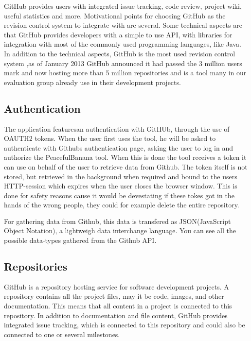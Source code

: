 GitHub provides users with integrated issue tracking, code review, project wiki, useful statistics and more. 
Motivational points for choosing GitHub as the revision control system to integrate with are several. Some technical aspects are that GitHub provides developers with a simple to use API\cite{githubapi}, with libraries for integration with most of the commonly used programming languages, like Java\cite{jgit}.\\
In addition to the technical aspects, GitHub is the most used revision control system ,as of January 2013 GitHub announced it had passed the 3 million users mark and now hosting more than 5 million repositories and is a tool many in our evaluation group already use in their development projects\cite{githubnumbers}.

\subsection{Authentication}
The application featuresan authentication with GitHUb, through the use of OAUTH2 tokens. When the user first uses the tool, he will be asked to authenticate with Githubs authentication page, asking the user to log in and authorize the PeacefulBanana tool. When this is done the tool receives a token it can use on behalf of the user to retrieve data from Github. The token itself is not stored, but retrieved in the background when required and bound to the users HTTP-session which expires when the user closes the browser window. This is done for safety reasons cause it would be devestating if these tokes got in the hands of the wrong people, they could for example delete the entire repository.

For gathering data from Github, this data is transfered as JSON(JavaScript Object Notation), a lightweigh data interchange language. You can see all the possible data-types gathered from the Github API.
\subsection{Repositories}
GitHub is a repository hosting service for software development projects. A repository contains all the project files, may it be code, images, and other documentation. This means that all content in a project is connected to this repository. In addition to documentation and file content, GitHub provides integrated issue tracking, which is connected to this repository and could also be connected to one or several milestones. 
